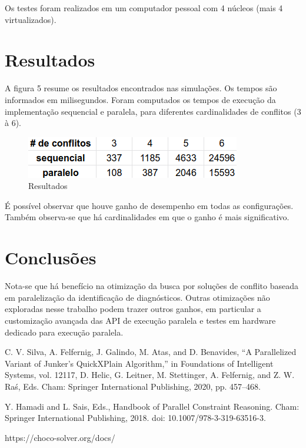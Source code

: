 \documentclass[conference]{IEEEtran}
\begin{document}
Os testes foram realizados em um computador pessoal com 4 núcleos (mais 4 virtualizados).

\section{Resultados}

A figura 5 resume os resultados encontrados nas simulações. Os tempos são informados em milisegundos. Foram computados os tempos de execução da implementação sequencial e paralela, para diferentes cardinalidades de conflitos (3 à 6).

\begin{figure}[htbp]
\centerline{\includegraphics[width=0.7\columnwidth]{result_table.png}}
\caption{Resultados} 
\label{fig}
\end{figure}

É possível observar que houve ganho de desempenho em todas as configurações. Também observa-se que há cardinalidades em que o ganho é mais significativo.

\section{Conclusões}

Nota-se que há benefício na otimização da busca por soluções de conflito baseada em paralelização da identificação de diagnósticos. Outras otimizações não exploradas nesse trabalho podem trazer outros ganhos, em particular a customização avançada das API de execução paralela e testes em hardware dedicado para execução paralela.

\begin{thebibliography}{00}
 C. V. Silva, A. Felfernig, J. Galindo, M. Atas, and D. Benavides, “A Parallelized Variant of Junker’s QuickXPlain Algorithm,” in Foundations of Intelligent Systems, vol. 12117, D. Helic, G. Leitner, M. Stettinger, A. Felfernig, and Z. W. Raś, Eds. Cham: Springer International Publishing, 2020, pp. 457–468.

 Y. Hamadi and L. Sais, Eds., Handbook of Parallel Constraint Reasoning. Cham: Springer International Publishing, 2018. doi: 10.1007/978-3-319-63516-3.

 https://choco-solver.org/docs/
\end{thebibliography}
\vspace{12pt}
\end{document}

